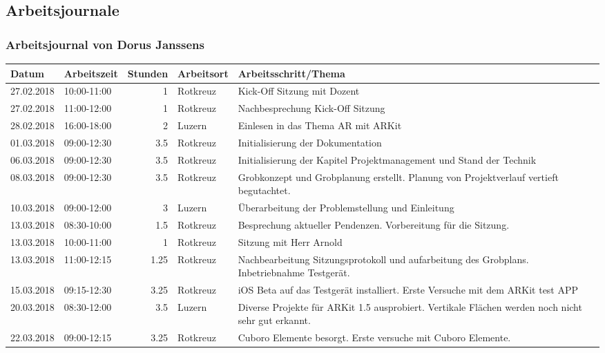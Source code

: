 \subsection{Arbeitsjournale}

\subsubsection{Arbeitsjournal von Dorus Janssens}

\begin{longtable}{llrlp{7cm}}
	\hline
	Datum      & Arbeitszeit & Stunden & Arbeitsort & Arbeitsschritt/Thema \\
	\hline
	27.02.2018 & 10:00-11:00 & 1      & Rotkreuz & Kick-Off Sitzung mit Dozent \\
	27.02.2018 & 11:00-12:00 & 1      & Rotkreuz & Nachbesprechung Kick-Off Sitzung \\
	28.02.2018 & 16:00-18:00 & 2      & Luzern & Einlesen in das Thema AR mit ARKit \\
	01.03.2018 & 09:00-12:30 & 3.5      & Rotkreuz & Initialisierung der Dokumentation \\
	06.03.2018 & 09:00-12:30 & 3.5      & Rotkreuz & Initialisierung der Kapitel Projektmanagement und Stand der Technik \\
	08.03.2018 & 09:00-12:30 & 3.5      & Rotkreuz & Grobkonzept und Grobplanung erstellt. Planung von Projektverlauf vertieft begutachtet. \\
	10.03.2018 & 09:00-12:00 & 3      & Luzern & Überarbeitung der Problemstellung und Einleitung \\
	13.03.2018 & 08:30-10:00 & 1.5      & Rotkreuz & Besprechung aktueller Pendenzen. Vorbereitung für die Sitzung. \\
	13.03.2018 & 10:00-11:00 & 1      & Rotkreuz & Sitzung mit Herr Arnold \\
	13.03.2018 & 11:00-12:15 & 1.25      & Rotkreuz & Nachbearbeitung Sitzungsprotokoll und aufarbeitung des Grobplans. Inbetriebnahme Testgerät. \\
	15.03.2018 & 09:15-12:30 & 3.25      & Rotkreuz & iOS Beta auf das Testgerät installiert. Erste Versuche mit dem ARKit test APP \\
	20.03.2018 & 08:30-12:00 & 3.5      & Luzern & Diverse Projekte für ARKit 1.5 ausprobiert. Vertikale Flächen werden noch nicht sehr gut erkannt. \\
	22.03.2018 & 09:00-12:15 & 3.25      & Rotkreuz & Cuboro Elemente besorgt. Erste versuche mit Cuboro Elemente. \\

\end{longtable}
